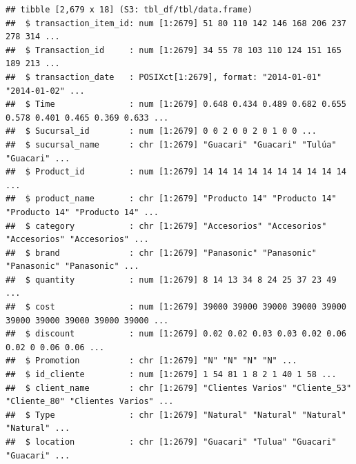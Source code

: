 \documentclass[
]{book}
\begin{document}
\begin{verbatim}
## tibble [2,679 x 18] (S3: tbl_df/tbl/data.frame)
##  $ transaction_item_id: num [1:2679] 51 80 110 142 146 168 206 237 278 314 ...
##  $ Transaction_id     : num [1:2679] 34 55 78 103 110 124 151 165 189 213 ...
##  $ transaction_date   : POSIXct[1:2679], format: "2014-01-01" "2014-01-02" ...
##  $ Time               : num [1:2679] 0.648 0.434 0.489 0.682 0.655 0.578 0.401 0.465 0.369 0.633 ...
##  $ Sucursal_id        : num [1:2679] 0 0 2 0 0 2 0 1 0 0 ...
##  $ sucursal_name      : chr [1:2679] "Guacari" "Guacari" "Tulúa" "Guacari" ...
##  $ Product_id         : num [1:2679] 14 14 14 14 14 14 14 14 14 14 ...
##  $ product_name       : chr [1:2679] "Producto 14" "Producto 14" "Producto 14" "Producto 14" ...
##  $ category           : chr [1:2679] "Accesorios" "Accesorios" "Accesorios" "Accesorios" ...
##  $ brand              : chr [1:2679] "Panasonic" "Panasonic" "Panasonic" "Panasonic" ...
##  $ quantity           : num [1:2679] 8 14 13 34 8 24 25 37 23 49 ...
##  $ cost               : num [1:2679] 39000 39000 39000 39000 39000 39000 39000 39000 39000 39000 ...
##  $ discount           : num [1:2679] 0.02 0.02 0.03 0.03 0.02 0.06 0.02 0 0.06 0.06 ...
##  $ Promotion          : chr [1:2679] "N" "N" "N" "N" ...
##  $ id_cliente         : num [1:2679] 1 54 81 1 8 2 1 40 1 58 ...
##  $ client_name        : chr [1:2679] "Clientes Varios" "Cliente_53" "Cliente_80" "Clientes Varios" ...
##  $ Type               : chr [1:2679] "Natural" "Natural" "Natural" "Natural" ...
##  $ location           : chr [1:2679] "Guacari" "Tulua" "Guacari" "Guacari" ...
\end{verbatim}
\end{document}
